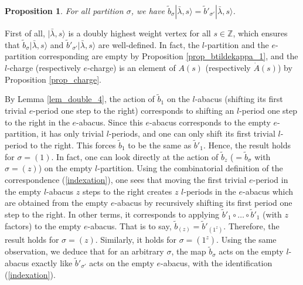 \documentclass[twoside,12pt]{amsart}
\theoremstyle{plain}
\newcommand{\Z}{\mathbb{Z}}
\newcommand{\si}{\sigma}
\newcommand{\la}{\lambda}
\newcommand{\tb}{\tilde{b}}
\newcommand{\dA}{\dot{A}}
\newtheorem{prop}[num]{Proposition}
\theoremstyle{remark}
\begin{document}
\begin{prop}\label{prop_btildekappa+_0}
For all partition $\si$, we have $\tb_{\si}|\bar{\la},s\rangle = \tb'_{\si'}|\bar{\la},s\rangle$.
\end{prop}

\proof
First of all, $|\bar{\la},s\rangle$ is a doubly highest weight vertex for all $s\in\Z$, which
ensures that $\tb_{\si}|\bar{\la},s\rangle$ and $\tb'_{\si'}|\bar{\la},s\rangle$ are well-defined.
In fact, the $l$-partition and the $e$-partition corresponding are empty by Proposition \ref{prop_btildekappa_1}, and the
$l$-charge (respectively $e$-charge) is an element of $A(s)$ (respectively $\dA(s)$)
by Proposition \ref{prop_charge}.

By Lemma \ref{lem_double_4}, the action of $\tb_{1}$ on the $l$-abacus
(shifting its first trivial $e$-period one step to the right) corresponds to shifting an
$l$-period one step to the right in the $e$-abacus.
Since this $e$-abacus corresponds to the empty $e$-partition, it has only trivial $l$-periods,
and one can only shift its first trivial $l$-period to the right.
This forces $\tb_1$ to be the same as $\tb'_1$. Hence, the result holds for $\si = (1)$.
In fact, one can look directly at the action of $\tb_z$ ($=\tb_{\si}$ with $\si=(z)$) on the empty $l$-partition.
Using the combinatorial definition of the correspondence (\ref{indexation}), one sees that moving
the first trivial $e$-period in the empty $l$-abacus $z$ steps to the right creates $z$
$l$-periods in the $e$-abacus which are obtained from the empty $e$-abacus by recursively shifting its first period
one step to the right.
In other terms, it corresponds to applying $\tb'_1\circ\dots\circ\tb'_1$ (with $z$ factors) to the empty $e$-abacus.
That is to say, $\tb_{(z)} = \tb'_{(1^z)}$. Therefore, the result holds for $\si=(z)$.
Similarly, it holds for $\si=(1^z)$.
Using the same observation, we deduce that for an arbitrary $\si$,
the map $\tb_{\si}$ acts on the empty $l$-abacus exactly like
$\tb'_{\si'}$ acts on the empty $e$-abacus, with the identification (\ref{indexation}).
\endproof
\end{document}
